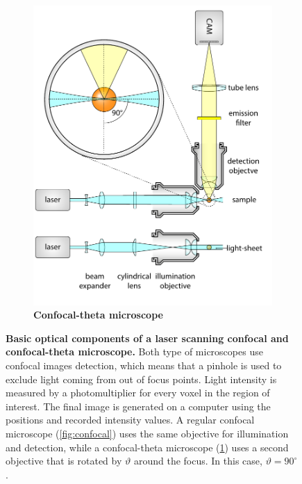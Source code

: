 \documentclass{diploma_style}
\begin{document}
\begin{figure}
\begin{subfigure}[t]{0.49\textwidth}
\end{subfigure}
\begin{subfigure}[t]{0.49\textwidth}
	\centering
	\includegraphics[page=5,width=\textwidth]{figures/1_spim/spim_cyl}
	\caption{\textbf{Confocal-theta microscope}}
	\label{fig:conf-theta}
\end{subfigure}
\caption{\textbf{Basic optical components of a laser scanning confocal and confocal-theta microscope.} Both type of microscopes use confocal images detection, which means that a pinhole is used to exclude light coming from out of focus points. Light intensity is measured by a photomultiplier for every voxel in the region of interest. The final image is generated on a computer using the positions and recorded intensity values. A regular confocal microscope (\ref{fig:confocal}) uses the same objective for illumination and detection, while a confocal-theta microscope (\ref{fig:conf-theta}) uses a second objective that is rotated by $\vartheta$ around the focus. In this case, $\vartheta = 90^\circ$.}
\label{fig:confocals}
\end{figure}
\end{document}
